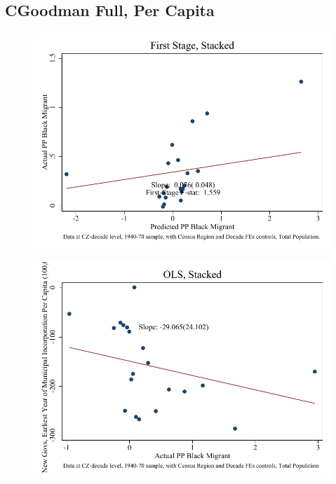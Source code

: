 \documentclass{article}
\begin{document}
\subsection{CGoodman Full, Per Capita}

\clearpage
\begin{figure}
\centering
\includegraphics{figures/simplefigs/stacked_cgoodman_pc_C3_total_fs.pdf}
\end{figure}
\clearpage
\begin{figure}
\centering
\includegraphics{figures/simplefigs/stacked_cgoodman_pc_C3_total_ols.pdf}
\end{figure}
\clearpage
\end{document}
